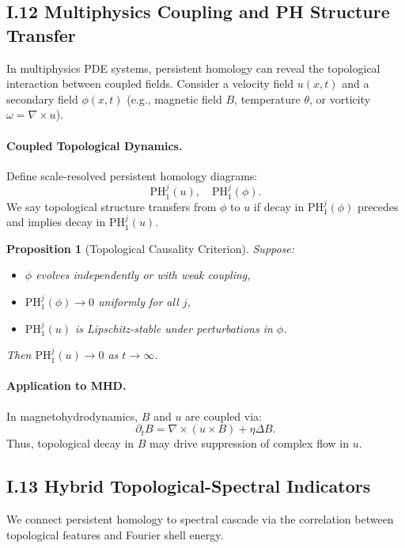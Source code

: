 \documentclass[11pt]{article}
\newtheorem{proposition}[theorem]{Proposition}
\theoremstyle{definition}
\begin{document}
\subsection*{I.12 Multiphysics Coupling and PH Structure Transfer}

In multiphysics PDE systems, persistent homology can reveal the topological interaction between coupled fields.
Consider a velocity field $u(x,t)$ and a secondary field $\phi(x,t)$ (e.g., magnetic field $B$, temperature $\theta$, or vorticity $\omega = \nabla \times u$).

\paragraph{Coupled Topological Dynamics.}
Define scale-resolved persistent homology diagrams:
\[
\mathrm{PH}_1^j(u), \quad \mathrm{PH}_1^j(\phi).
\]
We say topological structure transfers from $\phi$ to $u$ if decay in $\mathrm{PH}_1^j(\phi)$ precedes and implies decay in $\mathrm{PH}_1^j(u)$.

\begin{proposition}[Topological Causality Criterion]
Suppose:
\begin{itemize}
  \item $\phi$ evolves independently or with weak coupling,
  \item $\mathrm{PH}_1^j(\phi) \to 0$ uniformly for all $j$,
  \item $\mathrm{PH}_1^j(u)$ is Lipschitz-stable under perturbations in $\phi$.
\end{itemize}
Then $\mathrm{PH}_1^j(u) \to 0$ as $t \to \infty$.
\end{proposition}

\paragraph{Application to MHD.}
In magnetohydrodynamics, $B$ and $u$ are coupled via:
\[ \partial_t B = \nabla \times (u \times B) + \eta \Delta B. \]
Thus, topological decay in $B$ may drive suppression of complex flow in $u$.

\subsection*{I.13 Hybrid Topological-Spectral Indicators}

We connect persistent homology to spectral cascade via the correlation between topological features and Fourier shell energy.
\end{document}
